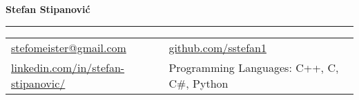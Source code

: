 \documentclass[letterpaper,11pt,oneside]{article}
\begin{document}

\noindent  \Huge{\textbf{Stefan Stipanović}}  \\
\vspace{-2ex}
\hrule
\normalsize


\begin{center}
\begin{tabular}{l l}
 \href{mailto:stefomeister@gmail.com}{stefomeister@gmail.com}    & \hspace{1in} \href{https://github.com/sstefan1}{github.com/sstefan1} \\
 \href{https://www.linkedin.com/in/stefan-stipanovic/}{linkedin.com/in/stefan-stipanovic/} & \hspace{1in}  Programming Languages: C++, C, C\#, Python
\end{tabular}
\end{center}

\vspace{1em}

\end{document}
